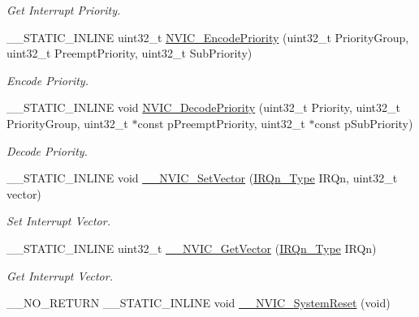 \begin{DoxyCompactItemize}
\begin{DoxyCompactList}\small\item\em Get Interrupt Priority. \end{DoxyCompactList}\item 
\+\_\+\+\_\+\+S\+T\+A\+T\+I\+C\+\_\+\+I\+N\+L\+I\+NE uint32\+\_\+t \mbox{\hyperlink{group___c_m_s_i_s___core___n_v_i_c_functions_gadb94ac5d892b376e4f3555ae0418ebac}{N\+V\+I\+C\+\_\+\+Encode\+Priority}} (uint32\+\_\+t Priority\+Group, uint32\+\_\+t Preempt\+Priority, uint32\+\_\+t Sub\+Priority)
\begin{DoxyCompactList}\small\item\em Encode Priority. \end{DoxyCompactList}\item 
\+\_\+\+\_\+\+S\+T\+A\+T\+I\+C\+\_\+\+I\+N\+L\+I\+NE void \mbox{\hyperlink{group___c_m_s_i_s___core___n_v_i_c_functions_ga3387607fd8a1a32cccd77d2ac672dd96}{N\+V\+I\+C\+\_\+\+Decode\+Priority}} (uint32\+\_\+t Priority, uint32\+\_\+t Priority\+Group, uint32\+\_\+t $\ast$const p\+Preempt\+Priority, uint32\+\_\+t $\ast$const p\+Sub\+Priority)
\begin{DoxyCompactList}\small\item\em Decode Priority. \end{DoxyCompactList}\item 
\+\_\+\+\_\+\+S\+T\+A\+T\+I\+C\+\_\+\+I\+N\+L\+I\+NE void \mbox{\hyperlink{group___c_m_s_i_s___core___n_v_i_c_functions_ga0df355460bc1783d58f9d72ee4884208}{\+\_\+\+\_\+\+N\+V\+I\+C\+\_\+\+Set\+Vector}} (\mbox{\hyperlink{group___configuration__section__for___c_m_s_i_s_ga7e1129cd8a196f4284d41db3e82ad5c8}{I\+R\+Qn\+\_\+\+Type}} I\+R\+Qn, uint32\+\_\+t vector)
\begin{DoxyCompactList}\small\item\em Set Interrupt Vector. \end{DoxyCompactList}\item 
\+\_\+\+\_\+\+S\+T\+A\+T\+I\+C\+\_\+\+I\+N\+L\+I\+NE uint32\+\_\+t \mbox{\hyperlink{group___c_m_s_i_s___core___n_v_i_c_functions_ga44b665d2afb708121d9b10c76ff00ee5}{\+\_\+\+\_\+\+N\+V\+I\+C\+\_\+\+Get\+Vector}} (\mbox{\hyperlink{group___configuration__section__for___c_m_s_i_s_ga7e1129cd8a196f4284d41db3e82ad5c8}{I\+R\+Qn\+\_\+\+Type}} I\+R\+Qn)
\begin{DoxyCompactList}\small\item\em Get Interrupt Vector. \end{DoxyCompactList}\item 
\+\_\+\+\_\+\+N\+O\+\_\+\+R\+E\+T\+U\+RN \+\_\+\+\_\+\+S\+T\+A\+T\+I\+C\+\_\+\+I\+N\+L\+I\+NE void \mbox{\hyperlink{group___c_m_s_i_s___core___n_v_i_c_functions_ga0d9aa2d30fa54b41eb780c16e35b676c}{\+\_\+\+\_\+\+N\+V\+I\+C\+\_\+\+System\+Reset}} (void)

\end{DoxyCompactItemize}
